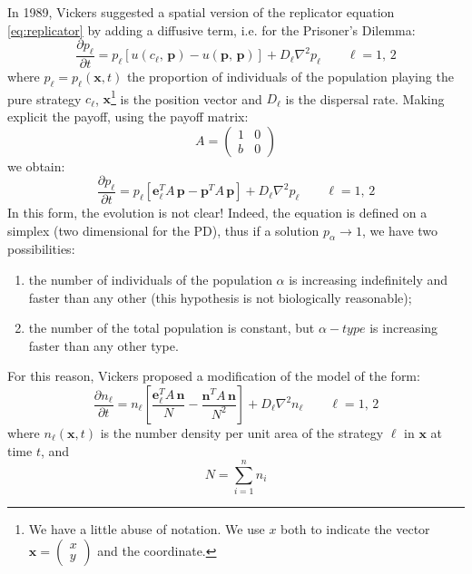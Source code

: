 In 1989, Vickers \cite{vickers_spatial_1989} suggested a spatial
version of the replicator equation \ref{eq:replicator} by adding
a diffusive term, i.e. for the Prisoner's Dilemma:
\[
\frac{\partial p_{\ell}}{\partial t}=p_{\ell}\left[u\left(c_{\ell},\,\mathbf{p}\right)-u\left(\mathbf{p},\,\mathbf{p}\right)\right]+D_{\ell}\nabla^{2}p_{\ell}\qquad\ell=1,\,2
\]
where $p_{\ell}=p_{\ell}\left(\mathbf{x},t\right)$ the proportion
of individuals of the population playing the pure strategy $c_{\ell}$,
$\mathbf{x}$\footnote{We have a little abuse of notation. We use $x$ both to indicate the
vector $\mathbf{x}=\left(\begin{array}{c}
x\\
y
\end{array}\right)$ and the coordinate.} is the position vector and $D_{\ell}$ is the dispersal rate. Making
explicit the payoff, using the payoff matrix:
\begin{equation}
A=\left(\begin{array}{cc}
1 & 0\\
b & 0
\end{array}\right)\label{eq:payoff}
\end{equation}
we obtain:
\[
\frac{\partial p_{\ell}}{\partial t}=p_{\ell}\left[\mathbf{e}_{\ell}^{T}A\,\mathbf{p}-\mathbf{p}^{T}A\,\mathbf{p}\right]+D_{\ell}\nabla^{2}p_{\ell}\qquad\ell=1,\,2
\]
In this form, the evolution is not clear! Indeed, the equation is
defined on a simplex (two dimensional for the PD), thus if a solution
$p_{\alpha}\rightarrow1$, we have two possibilities:
\begin{enumerate}
\item the number of individuals of the population $\alpha$ is increasing
indefinitely and faster than any other (this hypothesis is not biologically
reasonable);
\item the number of the total population is constant, but $\alpha-type$
is increasing faster than any other type. 
\end{enumerate}
For this reason, Vickers proposed a modification of the model of the
form:
\begin{equation}
\frac{\partial n_{\ell}}{\partial t}=n_{\ell}\left[\frac{\mathbf{e}_{\ell}^{T}A\,\mathbf{n}}{N}-\frac{\mathbf{n}^{T}A\,\mathbf{n}}{N^{2}}\right]+D_{\ell}\nabla^{2}n_{\ell}\qquad\ell=1,\,2\label{eq:vick}
\end{equation}
where $n_{\ell}\left(\mathbf{x},t\right)$ is the number density per
unit area of the strategy $\ell$ in $\mathbf{x}$ at time $t$, and
\[
N=\sum_{i=1}^{n}n_{i}
\]
